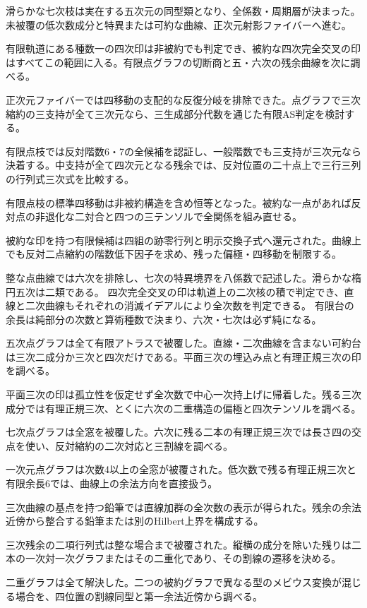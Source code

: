 \documentclass[11pt,a4paper]{ltjsarticle}
\begin{document}
滑らかな七次枝は実在する五次元の同型類となり、全係数・周期層が決まった。未被覆の低次数成分と特異または可約な曲線、正次元射影ファイバーへ進む。

有限軌道にある種数一の四次印は非被約でも判定でき、被約な四次完全交叉の印はすべてこの範囲に入る。有限点グラフの切断商と五・六次の残余曲線を次に調べる。

正次元ファイバーでは四移動の支配的な反復分岐を排除できた。点グラフで三次縮約の三支持が全て三次元なら、三生成部分代数を通じた有限AS判定を検討する。

有限点枝では反対階数6・7の全候補を認証し、一般階数でも三支持が三次元なら決着する。中支持が全て四次元となる残余では、反対位置の二十点上で三行三列の行列式三次式を比較する。

有限点枝の標準四移動は非被約構造を含め恒等となった。被約な一点があれば反対点の非退化な二対合と四つの三テンソルで全関係を組み直せる。

被約な印を持つ有限候補は四組の跡零行列と明示交換子式へ還元された。曲線上でも反対二点縮約の階数低下因子を求め、残った偏極・四移動を制限する。

整な点曲線では六次を排除し、七次の特異境界を八係数で記述した。滑らかな楕円五次は二類である。
四次完全交叉の印は軌道上の二次核の積で判定でき、直線と二次曲線もそれぞれの消滅イデアルにより全次数を判定できる。
有限台の余長は純部分の次数と算術種数で決まり、六次・七次は必ず純になる。

五次点グラフは全て有限アトラスで被覆した。直線・二次曲線を含まない可約台は三次二成分か三次と四次だけである。平面三次の埋込み点と有理正規三次の印を調べる。

平面三次の印は孤立性を仮定せず全次数で中心一次持上げに帰着した。残る三次成分では有理正規三次、とくに六次の二重構造の偏極と四次テンソルを調べる。

七次点グラフは全窓を被覆した。六次に残る二本の有理正規三次では長さ四の交点を使い、反対縮約の二次対応と三割線を調べる。

一次元点グラフは次数4以上の全窓が被覆された。低次数で残る有理正規三次と有限余長6では、曲線上の余法方向を直接扱う。

三次曲線の基点を持つ鉛筆では直線加群の全次数の表示が得られた。残余の余法近傍から整合する鉛筆または別のHilbert上界を構成する。

三次残余の二項行列式は整な場合まで被覆された。縦横の成分を除いた残りは二本の一次対一次グラフまたはその二重化であり、その割線の遷移を決める。

二重グラフは全て解決した。二つの被約グラフで異なる型のメビウス変換が混じる場合を、四位置の割線同型と第一余法近傍から調べる。
\end{document}
